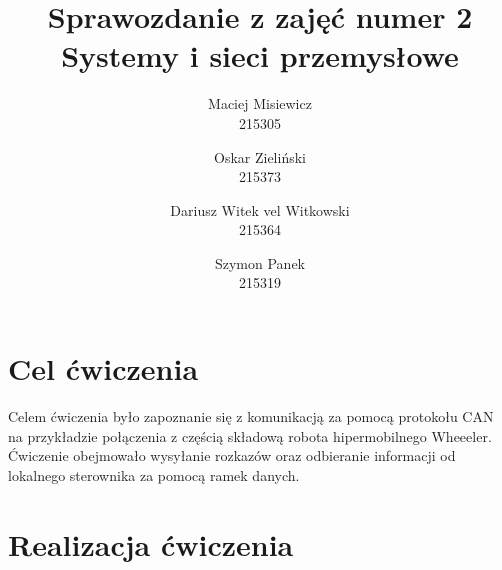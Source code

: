 \documentclass[margin = 2cm]{article}
\begin{document}
\title{\textbf{Sprawozdanie z zajęć numer 2 \\Systemy i sieci przemysłowe}} %
\author{Maciej Misiewicz\\215305 \and Oskar Zieliński\\215373 \and Dariusz Witek vel Witkowski\\215364 \and Szymon Panek\\215319}

\maketitle


\newpage
\tableofcontents
\newpage

\section{Cel ćwiczenia}
	Celem ćwiczenia było zapoznanie się z komunikacją za pomocą protokołu CAN na przykładzie połączenia z częścią składową robota hipermobilnego Wheeeler. Ćwiczenie obejmowało wysyłanie rozkazów oraz odbieranie informacji od lokalnego sterownika za pomocą ramek danych.
\section{Realizacja ćwiczenia}
\end{document}
